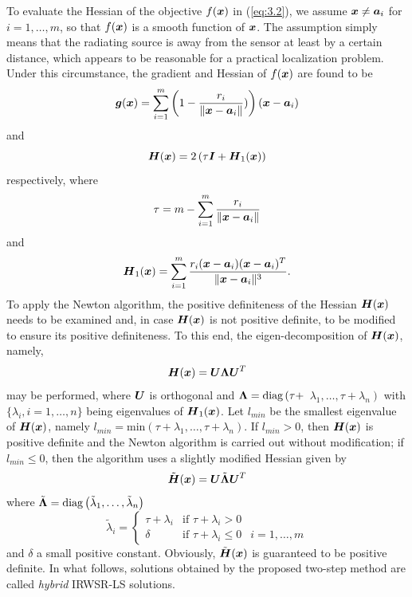To evaluate the Hessian of the objective $f(\mbox{\boldmath$x$})$ in (\ref{eq:3.2}), we assume $\mbox{\boldmath$x$}\neq\mbox{\boldmath$a$}_i$  for $i = 1, \ldots, m$, so that $f(\mbox{\boldmath$x$})$  is a smooth function of $\mbox{\boldmath$x$}$. The assumption simply means that the radiating source is away from the sensor at least by a certain distance, which appears to be reasonable for a practical localization problem. Under this circumstance, the gradient and Hessian of $f(\mbox{\boldmath$x$})$ are found to be
\begin{equation}
\nonumber
\mbox{\boldmath$g$}(\mbox{\boldmath$x$})=\sum_{i=1}^m\left(1-\frac{r_i}{\|\mbox{\boldmath$x$}-\mbox{\boldmath$a$}_i\|})\right)\left(\mbox{\boldmath$x$}-\mbox{\boldmath$a$}_i\right)
\end{equation}
and
\begin{equation}
\nonumber
\mbox{\boldmath$H$}(\mbox{\boldmath$x$})=2\left(\tau\mbox{\boldmath$I$}+\mbox{\boldmath$H$}_1(\mbox{\boldmath$x$})\right)
\end{equation}
respectively, where
\begin{equation}
\nonumber
\tau=m-\sum_{i=1}^m \frac{r_i}{\|\mbox{\boldmath$x$}-\mbox{\boldmath$a$}_i\|}
\end{equation}
and
\begin{equation}
\nonumber
\mbox{\boldmath$H$}_1(\mbox{\boldmath$x$})=\sum_{i=1}^m \frac{r_i(\mbox{\boldmath$x$}-\mbox{\boldmath$a$}_i)(\mbox{\boldmath$x$}-\mbox{\boldmath$a$}_i)^T}{\|\mbox{\boldmath$x$}-\mbox{\boldmath$a$}_i\|^3}.
\end{equation}
To apply the Newton algorithm, the positive definiteness of the Hessian $\mbox{\boldmath$H$}(\mbox{\boldmath$x$})$ needs to be examined and, in case $\mbox{\boldmath$H$}(\mbox{\boldmath$x$})$ is not positive definite, to be modified to ensure its positive definiteness. To this end, the eigen-decomposition of $\mbox{\boldmath$H$}(\mbox{\boldmath$x$})$, namely,
\begin{equation}
\nonumber
\mbox{\boldmath$H$}(\mbox{\boldmath$x$})=\mbox{\boldmath$U$}\mbox{\boldmath{$\Lambda$}}\mbox{\boldmath$U$}^T
\end{equation}
may be performed, where $\mbox{\boldmath$U$}$ is orthogonal and $\mbox{\boldmath{$\Lambda$}}=\mbox{diag}\left(\tau+\right.$ $\left.\lambda_1,\ldots, \tau+\lambda_n\right)$  with $\{\lambda_i,i=1,\ldots,n\}$ being eigenvalues of $\mbox{\boldmath$H$}_1(\mbox{\boldmath$x$})$. Let $l_{min}$  be the smallest eigenvalue of $\mbox{\boldmath$H$}(\mbox{\boldmath$x$})$, namely $l_{min}=\mbox{min}\left(\tau+\lambda_1,\ldots, \tau+\lambda_n\right)$.  If  $l_{min}>0$, then $\mbox{\boldmath$H$}(\mbox{\boldmath$x$})$  is positive definite and the Newton algorithm is carried out without modification; if $l_{min}\leq0$, then the algorithm uses a slightly modified Hessian given by
\begin{equation}
\nonumber
\tilde{\mbox{\boldmath$H$}}(\mbox{\boldmath$x$})=\mbox{\boldmath$U$}\tilde{\mbox{\boldmath{$\Lambda$}}}\mbox{\boldmath$U$}^T
\end{equation}
where $\tilde{\mbox{\boldmath{$\Lambda$}}}=\mbox{diag}\left(\tilde{\lambda}_1,\ldots, \tilde{\lambda}_n\right)$
\begin{equation}
\nonumber
\tilde{\lambda}_i=\left\{\begin{array} {lll}
    \tau+\lambda_i & \mbox{if } \tau+\lambda_i>0 & \\
    \delta &  \mbox{if } \tau+\lambda_i\leq0 & i=1,\ldots,m \end{array} \right.
\end{equation}
and $\delta$ a small positive constant. Obviously, $\tilde{\mbox{\boldmath$H$}}(\mbox{\boldmath$x$})$ is guaranteed to be positive definite. In what follows, solutions obtained by the proposed two-step method are called \textit{hybrid} IRWSR-LS solutions.

